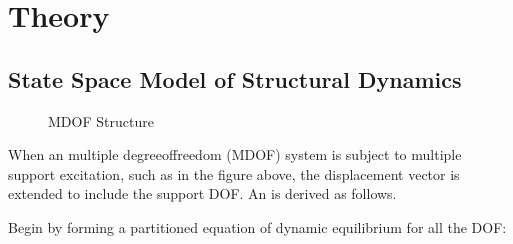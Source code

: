 \documentclass[letterpaper,10pt,english]{sphinxmanual}
\let\sphinxpxdimen\pdfpxdimen\else\newdimen\sphinxpxdimen
\begin{document}
\sphinxstepscope


\chapter{Theory}
\label{\detokenize{theory/index:theory}}\label{\detokenize{theory/index::doc}}
\sphinxstepscope


\section{State Space Model of Structural Dynamics}
\label{\detokenize{theory/statespace:state-space-model-of-structural-dynamics}}\label{\detokenize{theory/statespace::doc}}
\begin{figure}[htbp]
\centering
\capstart

\noindent\sphinxincludegraphics[width=3093\sphinxpxdimen,height=1172\sphinxpxdimen]{{si_msmdof}.png}
\caption{MDOF Structure}\label{\detokenize{theory/statespace:id1}}\end{figure}

\sphinxAtStartPar
When an multiple degree\sphinxhyphen{}of\sphinxhyphen{}freedom (MDOF) system is subject to multiple
support excitation, such as in the figure above, the displacement vector
is extended to include the support DOF. An {\hyperref[\detokenize{theory/statespace:equation-of-motion}]{}} is derived as follows.

\sphinxAtStartPar
Begin by forming a partitioned equation of dynamic equilibrium for all
the DOF:
\end{document}
